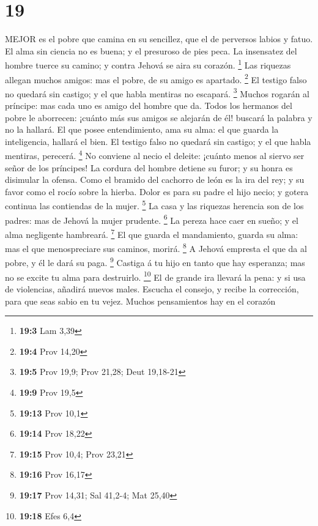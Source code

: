 \hypertarget{section-18}{%
\section{19}\label{section-18}}

 MEJOR es el pobre que camina en su sencillez, que el de
perversos labios y fatuo.  El alma sin ciencia no es buena;
y el presuroso de pies peca.  La insensatez del hombre
tuerce su camino; y contra Jehová se aira su corazón. \footnote{\textbf{19:3}
  Lam 3,39}  Las riquezas allegan muchos amigos: mas el
pobre, de su amigo es apartado. \footnote{\textbf{19:4} Prov 14,20}
 El testigo falso no quedará sin castigo; y el que habla
mentiras no escapará. \footnote{\textbf{19:5} Prov 19,9; Prov 21,28;
  Deut 19,18-21}  Muchos rogarán al príncipe: mas cada uno
es amigo del hombre que da.  Todos los hermanos del pobre le
aborrecen: ¡cuánto más sus amigos se alejarán de él! buscará la palabra
y no la hallará.  El que posee entendimiento, ama su alma:
el que guarda la inteligencia, hallará el bien.  El testigo
falso no quedará sin castigo; y el que habla mentiras, perecerá.
\footnote{\textbf{19:9} Prov 19,5}  No conviene al necio el
deleite: ¡cuánto menos al siervo ser señor de los príncipes!
 La cordura del hombre detiene su furor; y su honra es
disimular la ofensa.  Como el bramido del cachorro de león
es la ira del rey; y su favor como el rocío sobre la hierba.
 Dolor es para su padre el hijo necio; y gotera continua
las contiendas de la mujer. \footnote{\textbf{19:13} Prov 10,1}
 La casa y las riquezas herencia son de los padres: mas de
Jehová la mujer prudente. \footnote{\textbf{19:14} Prov 18,22}
 La pereza hace caer en sueño; y el alma negligente
hambreará. \footnote{\textbf{19:15} Prov 10,4; Prov 23,21} 
El que guarda el mandamiento, guarda su alma: mas el que menospreciare
sus caminos, morirá. \footnote{\textbf{19:16} Prov 16,17} 
A Jehová empresta el que da al pobre, y él le dará su paga. \footnote{\textbf{19:17}
  Prov 14,31; Sal 41,2-4; Mat 25,40}  Castiga á tu hijo en
tanto que hay esperanza; mas no se excite tu alma para destruirlo.
\footnote{\textbf{19:18} Efes 6,4}  El de grande ira
llevará la pena: y si usa de violencias, añadirá nuevos males.
 Escucha el consejo, y recibe la corrección, para que seas
sabio en tu vejez.  Muchos pensamientos hay en el corazón
